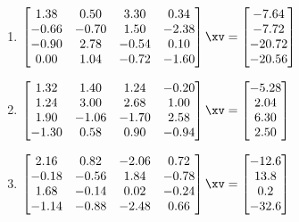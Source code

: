 \begin{exercise}
\begin{enumerate}
\item \(\begin{bmatrix} 1.38&0.50&3.30&0.34
\\-0.66&-0.70&1.50&-2.38
\\-0.90&2.78&-0.54&0.10
\\0.00&1.04&-0.72&-1.60 \end{bmatrix}\xv
=\begin{bmatrix} -7.64
\\-7.72
\\-20.72
\\-20.56 \end{bmatrix}\)
\setbox\ajrqrbox\hbox{}%
\marginpar{\usebox{\ajrqrbox\\[2ex]}}%


\item \(\begin{bmatrix} 1.32&1.40&1.24&-0.20
\\1.24&3.00&2.68&1.00
\\1.90&-1.06&-1.70&2.58
\\-1.30&0.58&0.90&-0.94 \end{bmatrix}\xv
=\begin{bmatrix} -5.28
\\2.04
\\6.30
\\2.50 \end{bmatrix}\)
\setbox\ajrqrbox\hbox{}%
\marginpar{\usebox{\ajrqrbox\\[2ex]}}%

\item \(\begin{bmatrix} 2.16&0.82&-2.06&0.72
\\-0.18&-0.56&1.84&-0.78
\\1.68&-0.14&0.02&-0.24
\\-1.14&-0.88&-2.48&0.66 \end{bmatrix}\xv
=\begin{bmatrix} -12.6
\\13.8
\\0.2
\\-32.6 \end{bmatrix}\)
\setbox\ajrqrbox\hbox{}%
\marginpar{\usebox{\ajrqrbox\\[2ex]}}%



\end{enumerate}
\end{exercise}
